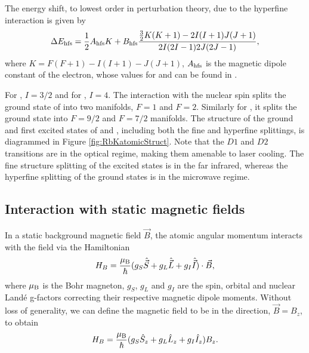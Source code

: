 The energy shift, to lowest order in perturbation theory, due to the hyperfine interaction is given by \cite{Arimondo1977, Steck}
\begin{equation}
\Delta E_{\rm hfs} = \frac{1}{2}A_{\rm hfs} K + B_{\rm hfs} \frac{\frac{3}{2}K(K+1)-2I(I+1)J(J+1)}{2I(2I-1)2J(2J-1)},
\end{equation}
where $K=F(F+1) - I(I+1)-J(J+1)$, $A_{\rm hfs}$ is the magnetic dipole constant of the electron, whose values for \Rb{} and \K{} can be found in \cite{Steck,Tiecke}. 

For \Rb{}, $I=3/2$ and for \K{}, $I=4$. The interaction with the nuclear spin splits the ground state of \Rb{} into two manifolds, $F=1$ and $F=2$. Similarly for \K{}, it splits the ground state into $F=9/2$ and $F=7/2$ manifolds. The structure of the ground and first excited states of \Rb{} and \K{}, including both the fine and hyperfine splittings, is diagrammed in Figure \ref{fig:RbKatomicStruct}. Note that the $D1$ and $D2$ transitions are in the optical regime, making them amenable to laser cooling. The fine structure splitting of the excited states is in the far infrared, whereas the hyperfine splitting of the ground states is in the microwave regime.  

\subsection{Interaction with static magnetic fields}\label{sec:hyperfineField}
In a static background magnetic field $\vec{B}$, the atomic angular momentum interacts with the field via the Hamiltonian
\begin{equation}
H_B = \frac{\mu_{\rm B}}{\hbar}(g_S\hat{\vec{S}}+g_L\hat{\vec{L}}+g_I\hat{\vec{I}})\cdot\vec{B},
\end{equation}
where $\mu_{\rm B}$ is the Bohr magneton, $g_S$, $g_L$ and $g_I$ are the spin, orbital and nuclear Land\'e g-factors correcting their respective magnetic dipole moments. Without loss of generality, we can define the magnetic field to be in the \ez{} direction, $\vec{B}=B_z$\ez{}, to obtain
\begin{equation}
H_B = \frac{\mu_{\rm B}}{\hbar}(g_S \hat{S}_z+g_L \hat{L}_z+g_I \hat{I}_z) B_z.
\label{eqn:BHam}
\end{equation}

